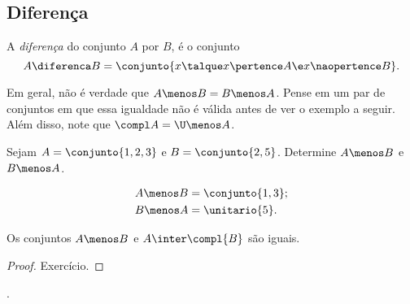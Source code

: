 \subsection{Diferença}

\begin{definition}
	\label{def:setminus}
	A \emph{diferença} do conjunto $A$ por $B$, é o conjunto
	\[
		A \diferenca B = \conjunto{ x \talque  x \pertence A \e x \naopertence B}.
	\]
\end{definition}

\begin{remark}
	Em geral, não é verdade que $A \menos B = B \menos A$. Pense em um par de conjuntos em que essa igualdade não é válida antes de ver o exemplo a seguir. Além disso, note que $\compl A = \U \menos A$.
\end{remark}

\begin{example}
	Sejam $A = \conjunto{1, 2, 3}$ e $ B = \conjunto{2,5}$. Determine $A \menos B$ e $B \menos A$.
\end{example}
	
\begin{solution}
	\begin{align*}
		&A \menos B = \conjunto{1,3};\\
		&B \menos A = \unitario{5}.
	\end{align*}
\end{solution}

\begin{proposition}
Os conjuntos $A\menos B$ e $A\inter \compl{B}$ são iguais.
	\begin{proof}
		Exercício.
	\end{proof}
\end{proposition}

\begin{onlineact}
	.
\end{onlineact}